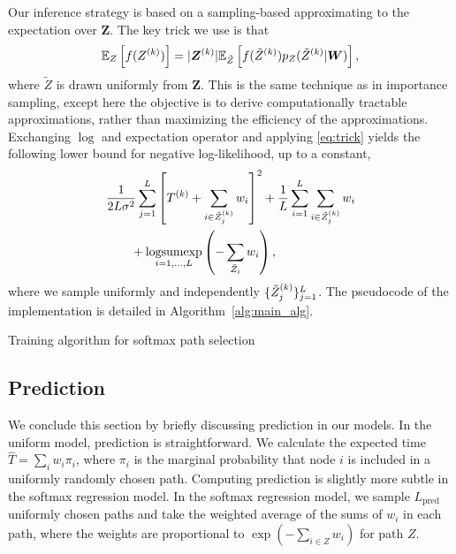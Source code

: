 \documentclass{article}
\begin{document}
Our inference strategy is based on a sampling-based approximating to the expectation over $\bm Z$. The key trick we use is that 
\begin{equation}
\label{eq:trick}
  \mathbb{E}_{Z}\left[{f(Z^{(k)})}\right] = |\bm Z^{(k)}| \mathbb{E}_{\tilde Z}\left[{f(\tilde Z^{(k)})p_Z(\tilde Z^{(k)}|\bm W)}\right],
\end{equation}
where $\tilde Z$ is drawn uniformly from $\bm Z$. This is the same technique as in importance sampling, except here the objective is to derive computationally tractable approximations, rather than maximizing the efficiency of the approximations. Exchanging $\log$ and expectation operator and applying \eqref{eq:trick} yields the following lower bound for negative log-likelihood, up to a constant,
\begin{align}
&\frac{1}{2L\sigma^2}\sum_{j=1}^L \left[{T^{(k)} + \sum_{i\in \tilde Z^{(k)}_j}w_i}\right]^2 + \frac{1}{L}\sum_{i=1}^L\sum_{i\in\tilde Z_{j}^{(k)}}w_i 
\label{eq:softmax_objective}
\\&\qquad + \underset{i=1,\ldots,L}{\text{logsumexp}}\left({-\sum_{\tilde Z_i} w_i}\right) \nonumber,
\end{align}
where we sample uniformly and independently $\{\tilde Z_j^{(k)}\}_{j=1}^L$. The pseudocode of the implementation is detailed in Algorithm~\ref{alg:main_alg}.

\begin{algorithm}
  \begin{algorithmic}
    
      \ENDFOR
  \end{algorithmic}
  \caption{Training algorithm for softmax path selection}
  \label{alg:main_alg}
\end{algorithm}


\subsection{Prediction}
\label{sub:predict}
We conclude this section by briefly discussing prediction in our models. In the uniform model, prediction is straightforward. We calculate the expected time $\hat T = \sum_i w_i \pi_i$, where $\pi_i$ is the marginal probability that node $i$ is included in a uniformly randomly chosen path. Computing prediction is slightly more subtle in the softmax regression model. In the softmax regression model, we sample $L_{\text{pred}}$ uniformly chosen paths and take the weighted average of the sums of $w_i$ in each path, where the weights are proportional to $\exp(-\sum_{i \in Z} w_i)$ for path $Z$. 
\end{document}

